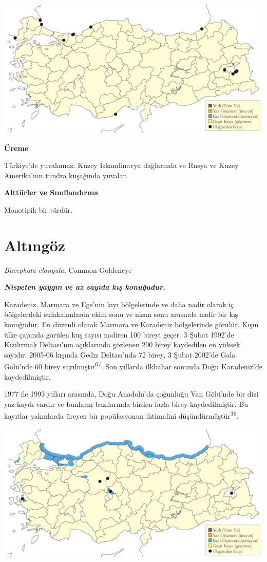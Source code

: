 \documentclass[
  letterpaper,
  DIV=11,
  numbers=noendperiod]{scrreprt}
\begin{document}
\includegraphics{images/harita_Page_030.png}

\textbf{Üreme}

Türkiye'de yuvalamaz. Kuzey İskandinavya dağlarında ve Rusya ve Kuzey
Amerika'nın tundra kuşağında yuvalar.

\textbf{Alttürler ve Sınıflandırma}

Monotipik bir türdür.

\section{Altıngöz}\label{altux131nguxf6z}

\emph{Bucephala clangula,} Common Goldeneye

\textbf{\emph{Nispeten yaygın ve az sayıda kış konuğudur.}}

Karadeniz, Marmara ve Ege'nin kıyı bölgelerinde ve daha nadir olarak iç
bölgelerdeki sulakalanlarda ekim sonu ve nisan sonu arasında nadir bir
kış konuğudur. En düzenli olarak Marmara ve Karadeniz bölgelerinde
görülür. Kışın ülke çapında görülen kuş sayısı nadiren 100 bireyi geçer.
3 Şubat 1992'de Kızılırmak Deltası'nın açıklarında gözlenen 200 birey
kaydedilen en yüksek sayıdır. 2005-06 kışında Gediz Deltası'nda 72
birey, 3 Şubat 2002'de Gala Gölü'nde 60 birey
sayılmıştır\textsuperscript{67}. Son yıllarda ilkbahar sonunda Doğu
Karadeniz'de kaydedilmiştir.

1977 ile 1993 yılları arasında, Doğu Anadolu'da çoğunluğu Van Gölü'nde
bir dizi yaz kaydı vardır ve bunların bazılarında birden fazla birey
kaydedilmiştir. Bu kayıtlar yakınlarda üreyen bir popülasyonun
ihtimalini düşündürmüştür\textsuperscript{36}.

\includegraphics{images/harita_Page_031.png}
\end{document}

